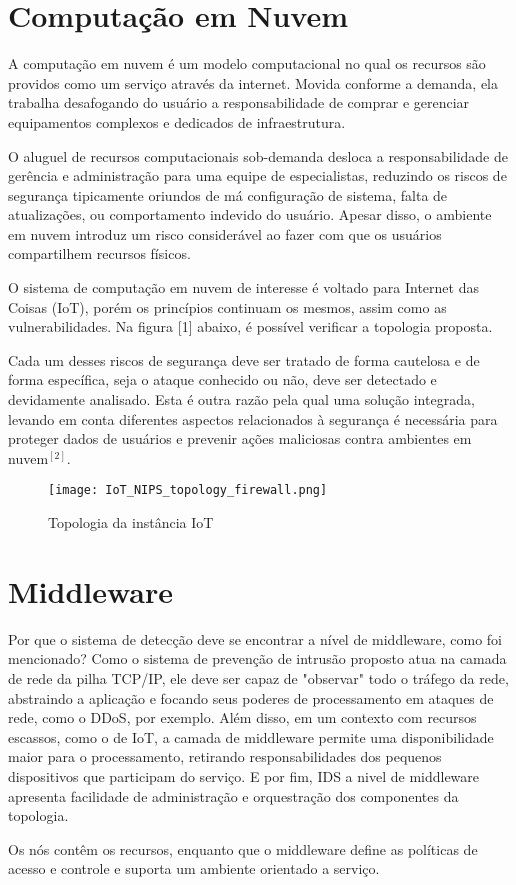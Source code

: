 \documentclass[journal]{IEEEtran}
\begin{document}
\section{Computação em Nuvem}
A computação em nuvem é um modelo computacional no qual os recursos são providos como um serviço através da internet. Movida conforme a demanda, ela trabalha desafogando do usuário a responsabilidade de comprar e gerenciar equipamentos complexos e dedicados de infraestrutura. \par
O aluguel de recursos computacionais sob-demanda desloca a responsabilidade de gerência e administração para uma equipe de especialistas, reduzindo os riscos de segurança tipicamente oriundos de má configuração de sistema, falta de atualizações, ou comportamento indevido do usuário. Apesar disso, o ambiente em nuvem introduz um risco considerável ao fazer com que os usuários compartilhem recursos físicos. \par
O sistema de computação em nuvem de interesse é voltado para Internet das Coisas (IoT), porém os princípios continuam os mesmos, assim como as vulnerabilidades. Na figura [1] abaixo, é possível verificar a topologia proposta. \par
Cada um desses riscos de segurança deve ser tratado de forma cautelosa e de forma específica, seja o ataque conhecido ou não, deve ser detectado e devidamente analisado. Esta é outra razão pela qual uma solução integrada, levando em conta diferentes aspectos relacionados à segurança é necessária para proteger dados de usuários e prevenir ações maliciosas contra ambientes em nuvem$^{ [2] }$.

\begin{figure}[h!]
	\texttt{[image: IoT\_NIPS\_topology\_firewall.png]}
	\caption{Topologia da instância IoT}
	\label{fig:NIPS_IoT_Topology}
\end{figure}

\section{Middleware}
Por que o sistema de detecção deve se encontrar a nível de middleware, como foi mencionado? Como o sistema de prevenção de intrusão proposto atua na camada de rede da pilha TCP/IP, ele deve ser capaz de "observar" todo o tráfego da rede, abstraindo a aplicação e focando seus poderes de processamento em ataques de rede, como o DDoS, por exemplo. Além disso, em um contexto com recursos escassos, como o de IoT, a camada de middleware permite uma disponibilidade maior para o processamento, retirando responsabilidades dos pequenos dispositivos que participam do serviço. E por fim, IDS a nivel de middleware apresenta facilidade de administração e orquestração dos componentes da topologia. \par
Os nós contêm os recursos, enquanto que o middleware define as políticas de acesso e controle e suporta um ambiente orientado a serviço. \par
\end{document}
